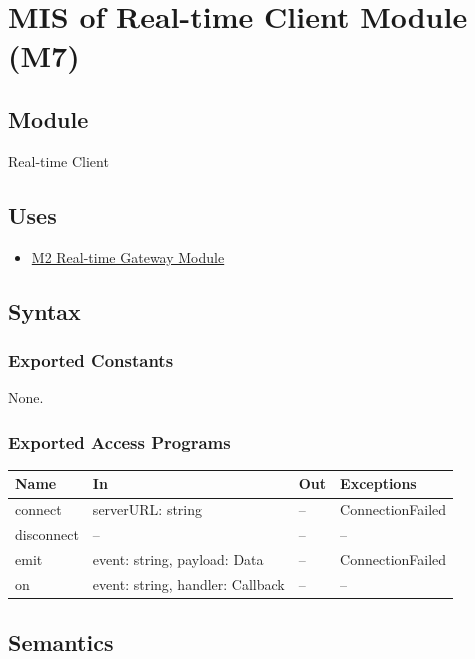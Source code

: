 \documentclass[12pt, titlepage]{article}
\begin{document}
\newpage
\section{MIS of Real-time Client Module (M7)}\label{sec:realtime-client-module}

\subsection{Module}
Real-time Client

\subsection{Uses}
\begin{itemize}
    \item \hyperref[sec:realtime-gateway-module]{M2 Real-time Gateway Module}
\end{itemize}

\subsection{Syntax}

\subsubsection{Exported Constants}
None.

\subsubsection{Exported Access Programs}

\begin{center}
    \begin{tabular}{p{4cm} p{5cm} p{3cm} p{3.5cm}}
        \toprule
        \textbf{Name} & \textbf{In} & \textbf{Out} & \textbf{Exceptions} \\
        \midrule
        connect & serverURL: string & -- & ConnectionFailed \\
        disconnect & -- & -- & -- \\
        emit & event: string, payload: Data & -- & ConnectionFailed \\
        on & event: string, handler: Callback & -- & -- \\
        \bottomrule
    \end{tabular}
\end{center}

\subsection{Semantics}
\end{document}
